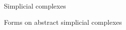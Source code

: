 \documentclass[../main.tex]{subfiles}
\begin{document}
\begin{subsection}{Simplicial complexes}
        
\end{subsection}
\begin{subsection}{Forms on abstract simplicial complexes}
        
\end{subsection}
\begin{comment}
\begin{subsection}{Integration on simplicial chains}
    
\end{subsection}
\begin{subsection}{Smooth real manifolds and abstract graphs}
    
\end{subsection}
\begin{subsection}{Convolutional neural networks on euclidean domains}
    
\end{subsection}
\end{comment}
\end{document}
